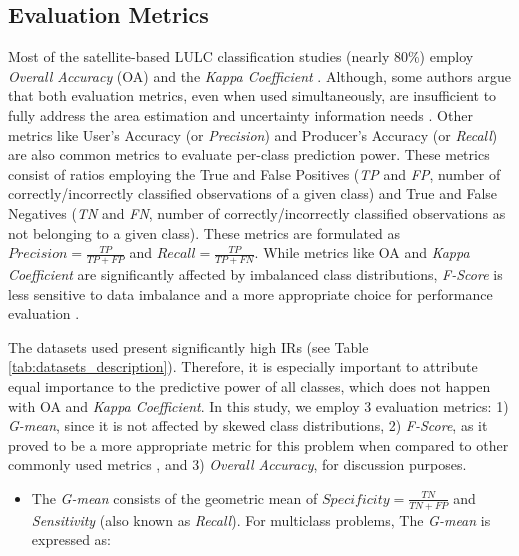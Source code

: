 \documentclass[remotesensing,article,submit,moreauthors,pdftex]{Definitions/mdpi}
\begin{document}
\begin{paracol}{2}
\linenumbers
\switchcolumn

\subsection{Evaluation Metrics}

Most of the satellite-based LULC classification studies (nearly 80\%) employ
\textit{Overall Accuracy} (OA) and the \textit{Kappa Coefficient}
\cite{Gavade2019}. Although, some authors argue that both evaluation metrics,
even when used simultaneously, are insufficient to fully address the area
estimation and uncertainty information needs \cite{Olofsson2013,Pontius2011}.
Other metrics like User's Accuracy (or \textit{Precision}) and Producer's
Accuracy (or \textit{Recall}) are also common metrics to evaluate per-class
prediction power. These metrics consist of ratios employing the True and False
Positives (\textit{TP} and \textit{FP}, number of correctly/incorrectly
classified observations of a given class) and True and False Negatives
(\textit{TN} and \textit{FN}, number of correctly/incorrectly classified
observations as not belonging to a given class). These metrics are formulated as
$Precision = \frac{TP}{TP+FP}$ and $Recall = \frac{TP}{TP+FN}$. While metrics
like OA and \textit{Kappa Coefficient} are significantly affected by imbalanced
class distributions, \textit{F-Score} is less sensitive to data imbalance and a
more appropriate choice for performance evaluation \cite{Jeni2013}.

The datasets used present significantly high IRs (see Table
\ref{tab:datasets_description}). Therefore, it is especially important to
attribute equal importance to the predictive power of all classes, which does
not happen with OA and \textit{Kappa Coefficient}. In this study, we employ 3
evaluation metrics: 1) \textit{G-mean}, since it is not affected by skewed class
distributions, 2) \textit{F-Score}, as it proved to be a more appropriate metric
for this problem when compared to other commonly used metrics \cite{Jeni2013},
and 3) \textit{Overall Accuracy}, for discussion purposes.

\begin{itemize}
	\item The \textit{G-mean} consists of the geometric mean of
	      $Specificity = \frac{TN}{TN + FP}$ and \textit{Sensitivity} (also known as \textit{Recall}). For multiclass problems, The
	      \textit{G-mean} is expressed as:


\end{itemize}
\end{paracol}
\end{document}
